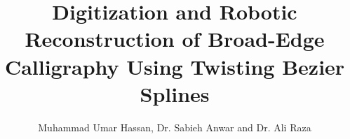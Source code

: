 \documentclass[12pt,onecolumn,aps,prb,preprint]{revtex4}   %
\begin{document}
\title{Digitization and Robotic Reconstruction of Broad-Edge Calligraphy Using Twisting Bezier Splines}
\author{Muhammad Umar Hassan, Dr. Sabieh Anwar and Dr. Ali Raza}
%

\maketitle
\tableofcontents






\end{document}
